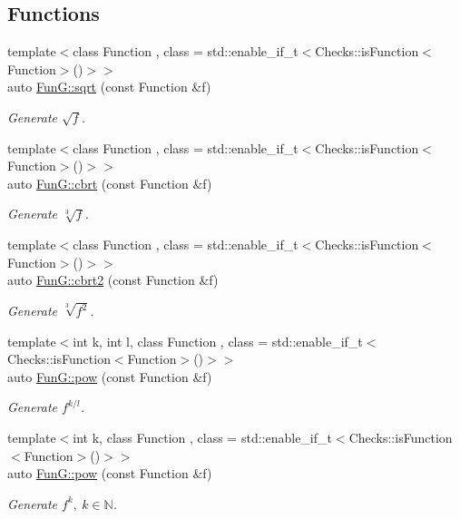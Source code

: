 \subsection*{\-Functions}
\begin{DoxyCompactItemize}
\item 
{\footnotesize template$<$class Function , class  = std\-::enable\-\_\-if\-\_\-t$<$\-Checks\-::is\-Function$<$\-Function$>$()$>$$>$ }\\auto \hyperlink{group__CMathGroup_ga136c890475e48f88469a737d95368d05}{\-Fun\-G\-::sqrt} (const \-Function \&f)
\begin{DoxyCompactList}\small\item\em \-Generate $ \sqrt{f} $. \end{DoxyCompactList}\item 
{\footnotesize template$<$class Function , class  = std\-::enable\-\_\-if\-\_\-t$<$\-Checks\-::is\-Function$<$\-Function$>$()$>$$>$ }\\auto \hyperlink{group__CMathGroup_gaa7f2552adfb8ec41aeb685adddd8bf98}{\-Fun\-G\-::cbrt} (const \-Function \&f)
\begin{DoxyCompactList}\small\item\em \-Generate $ \sqrt[3]{f} $. \end{DoxyCompactList}\item 
{\footnotesize template$<$class Function , class  = std\-::enable\-\_\-if\-\_\-t$<$\-Checks\-::is\-Function$<$\-Function$>$()$>$$>$ }\\auto \hyperlink{group__CMathGroup_gafd27322fb64c6df3366f384c93819a06}{\-Fun\-G\-::cbrt2} (const \-Function \&f)
\begin{DoxyCompactList}\small\item\em \-Generate $ \sqrt[3]{f^2}$. \end{DoxyCompactList}\item 
{\footnotesize template$<$int k, int l, class Function , class  = std\-::enable\-\_\-if\-\_\-t$<$\-Checks\-::is\-Function$<$\-Function$>$()$>$$>$ }\\auto \hyperlink{group__CMathGroup_gaecae6fa60bbfc0eb1867581ee4577d4e}{\-Fun\-G\-::pow} (const \-Function \&f)
\begin{DoxyCompactList}\small\item\em \-Generate $ f^{k/l} $. \end{DoxyCompactList}\item 
{\footnotesize template$<$int k, class Function , class  = std\-::enable\-\_\-if\-\_\-t$<$\-Checks\-::is\-Function$<$\-Function$>$()$>$$>$ }\\auto \hyperlink{group__CMathGroup_gab52ffe2efd379aad7ea322de46103465}{\-Fun\-G\-::pow} (const \-Function \&f)
\begin{DoxyCompactList}\small\item\em \-Generate $ f^k,\ k\in\mathbb{N}$. \end{DoxyCompactList}\end{DoxyCompactItemize}
